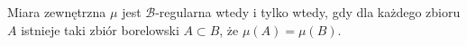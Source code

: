 \begin{defi}
    Miara zewnętrzna $\mu$ jest $\mathcal{B}$-regularna wtedy i tylko wtedy, gdy dla każdego zbioru $A$ istnieje taki
    zbiór borelowski $A \subset B$, że $\mu(A) = \mu(B)$.
\end{defi}